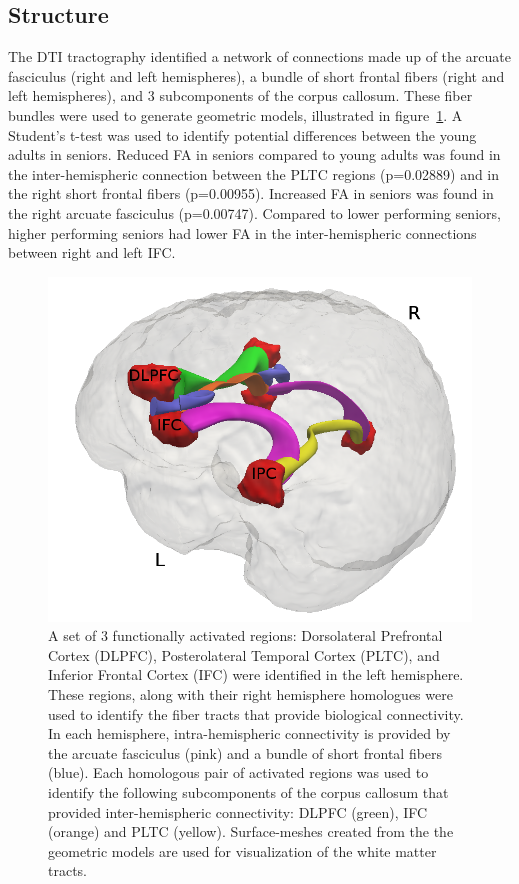 \subsection{Structure}
The DTI tractography identified a network of connections made up of the arcuate fasciculus (right and left hemispheres), a bundle of short frontal fibers (right and left hemispheres), and 3 subcomponents of the corpus callosum. These fiber bundles were used to generate geometric models, illustrated in figure~\ref{fig:fibers}. A Student's t-test was used to identify potential differences between the young adults in seniors. Reduced FA in seniors compared to young adults was found in the inter-hemispheric connection between the PLTC regions (p=0.02889) and in the right short frontal fibers (p=0.00955). Increased FA in seniors was found in the right arcuate fasciculus (p=0.00747). Compared to lower performing seniors, higher performing seniors had lower FA in the inter-hemispheric connections between right and left IFC. 

\begin{figure}
\begin{center}
\includegraphics[width=0.9\linewidth]{figures/big_lat_labeled.png}
\caption{A set of 3 functionally activated regions: Dorsolateral Prefrontal Cortex (DLPFC), Posterolateral Temporal Cortex (PLTC), and Inferior Frontal Cortex (IFC) were identified in the left hemisphere. These regions, along with their right hemisphere homologues were used to identify the fiber tracts that provide biological connectivity. In each hemisphere, intra-hemispheric connectivity is provided by the arcuate fasciculus (pink) and a bundle of short frontal fibers (blue). Each homologous pair of activated regions was used to identify the following subcomponents of the corpus callosum that provided inter-hemispheric connectivity: DLPFC (green), IFC (orange) and PLTC (yellow). Surface-meshes created from the the geometric models are used for visualization of the white matter tracts.}
\label{fig:fibers}
\end{center}
\end{figure}

